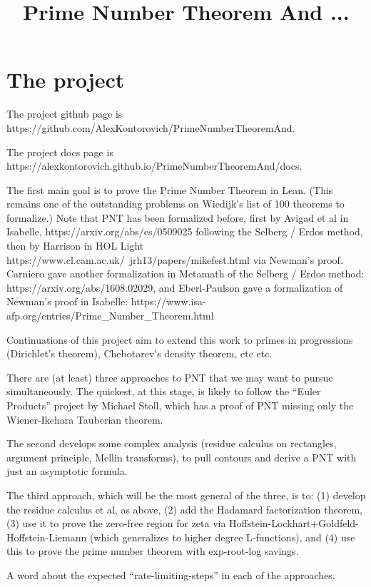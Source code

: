 \documentclass{report}
\title{Prime Number Theorem And ...}
\theoremstyle{definition}
\begin{document}
\maketitle

\chapter{The project}

The project github page is https://github.com/AlexKontorovich/PrimeNumberTheoremAnd.

The project docs page is https://alexkontorovich.github.io/PrimeNumberTheoremAnd/docs.

The first main goal is to prove the Prime Number Theorem in Lean.
(This remains one of the outstanding problems on Wiedijk's list of 100 theorems to formalize.) 
Note that PNT has been formalized before, first by Avigad et al in Isabelle,
https://arxiv.org/abs/cs/0509025
following the Selberg / Erdos method, then 
by Harrison in HOL Light 
https://www.cl.cam.ac.uk/~jrh13/papers/mikefest.html
via Newman's proof.
Carniero gave another formalization in Metamath of the Selberg / Erdos method:
https://arxiv.org/abs/1608.02029,
and Eberl-Paulson gave a formalization of Newman's proof in Isabelle:
https://www.isa-afp.org/entries/Prime_Number_Theorem.html 

Continuations of this project aim to extend
this work to primes in progressions (Dirichlet's theorem), Chebotarev's density theorem, etc
etc.

There are (at least) three approaches to PNT that we may want to pursue simultaneously. The quickest, at this stage, is likely to
follow
 the ``Euler Products'' project by Michael Stoll, which has a proof of PNT missing only the Wiener-Ikehara Tauberian theorem.

The second develops some complex analysis (residue calculus on rectangles, argument principle, Mellin transforms), to pull contours and derive a PNT with just an asymptotic formula.

The third approach, which will be the most general of the three, is to: (1) develop the residue calculus et al, as above, (2) add the Hadamard factorization theorem, (3) use it to prove the zero-free region for zeta via Hoffstein-Lockhart+Goldfeld-Hoffstein-Liemann (which generalizes to higher degree L-functions), and (4) use this to prove the prime number theorem with exp-root-log savings.

A word about the expected ``rate-limiting-steps'' in each of the approaches. 
\end{document}
